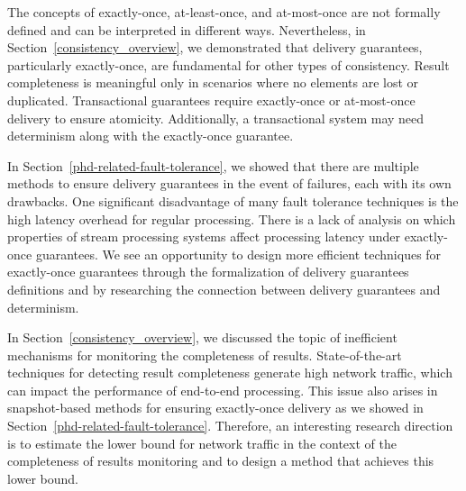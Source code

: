 The concepts of exactly-once, at-least-once, and at-most-once are not formally defined and can be interpreted in different ways. Nevertheless, in Section~\ref{consistency_overview}, we demonstrated that delivery guarantees, particularly exactly-once, are fundamental for other types of consistency. Result completeness is meaningful only in scenarios where no elements are lost or duplicated. Transactional guarantees require exactly-once or at-most-once delivery to ensure atomicity. Additionally, a transactional system may need determinism along with the exactly-once guarantee.

In Section~\ref{phd-related-fault-tolerance}, we showed that there are multiple methods to ensure delivery guarantees in the event of failures, each with its own drawbacks. One significant disadvantage of many fault tolerance techniques is the high latency overhead for regular processing. There is a lack of analysis on which properties of stream processing systems affect processing latency under exactly-once guarantees. We see an opportunity to design more efficient techniques for exactly-once guarantees through the formalization of delivery guarantees definitions and by researching the connection between delivery guarantees and determinism.

In Section~\ref{consistency_overview}, we discussed the topic of inefficient mechanisms for monitoring the completeness of results. State-of-the-art techniques for detecting result completeness generate high network traffic, which can impact the performance of end-to-end processing. This issue also arises in snapshot-based methods for ensuring exactly-once delivery as we showed in Section~\ref{phd-related-fault-tolerance}. Therefore, an interesting research direction is to estimate the lower bound for network traffic in the context of the completeness of results monitoring and to design a method that achieves this lower bound.